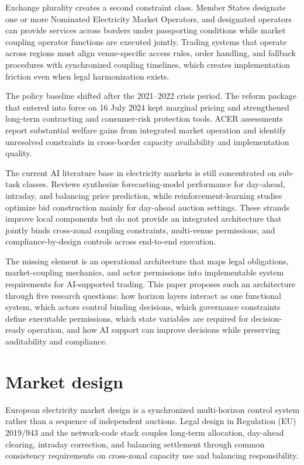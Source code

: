 \documentclass[oneside,10pt]{swissi}
\begin{document}
Exchange plurality creates a second constraint class. Member States designate one or more Nominated Electricity Market Operators, and designated operators can provide services across borders under passporting conditions while market coupling operator functions are executed jointly.\cite{acer_market_coupling_development_2026} Trading systems that operate across regions must align venue-specific access rules, order handling, and fallback procedures with synchronized coupling timelines, which creates implementation friction even when legal harmonization exists.\cite{acer_final_assessment_report_2022}

The policy baseline shifted after the 2021--2022 crisis period. The reform package that entered into force on 16 July 2024 kept marginal pricing and strengthened long-term contracting and consumer-risk protection tools.\cite{ec_electricity_market_design_2026} ACER assessments report substantial welfare gains from integrated market operation and identify unresolved constraints in cross-border capacity availability and implementation quality.\cite{acer_final_assessment_report_2022}

The current AI literature base in electricity markets is still concentrated on sub-task classes. Reviews synthesize forecasting-model performance for day-ahead, intraday, and balancing price prediction, while reinforcement-learning studies optimize bid construction mainly for day-ahead auction settings.\cite{lago_marcjasz_schutter_weron_2021_epf,oconnor_bahloul_prestwich_visentin_2025_epf,di_persio_garbelli_giordano_2025_rl_bidding} These strands improve local components but do not provide an integrated architecture that jointly binds cross-zonal coupling constraints, multi-venue permissions, and compliance-by-design controls across end-to-end execution.

The missing element is an operational architecture that maps legal obligations, market-coupling mechanics, and actor permissions into implementable system requirements for AI-supported trading. This paper proposes such an architecture through five research questions: how horizon layers interact as one functional system, which actors control binding decisions, which governance constraints define executable permissions, which state variables are required for decision-ready operation, and how AI support can improve decisions while preserving auditability and compliance.

\section{Market design}
European electricity market design is a synchronized multi-horizon control system rather than a sequence of independent auctions. Legal design in Regulation (EU) 2019/943 and the network-code stack couples long-term allocation, day-ahead clearing, intraday correction, and balancing settlement through common consistency requirements on cross-zonal capacity use and balancing responsibility.\cite{eu_reg_2019_943,ec_network_codes_2026,eu_reg_2016_1719}
\end{document}
